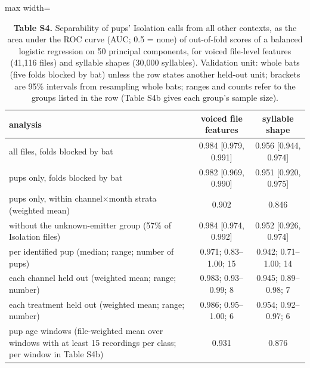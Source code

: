 \begin{table}[htbp]\centering\scriptsize
\caption{\textbf{Table S4.} Separability of pups' Isolation calls from all other contexts, as the area under the ROC curve (AUC; 0.5 = none) of out-of-fold scores of a balanced logistic regression on 50 principal components, for voiced file-level features (41,116 files) and syllable shapes (30,000 syllables). Validation unit: whole bats (five folds blocked by bat) unless the row states another held-out unit; brackets are 95\% intervals from resampling whole bats; ranges and counts refer to the groups listed in the row (Table S4b gives each group's sample size).}\label{tab:S4}
\begin{adjustbox}{max width=\linewidth}
\begin{tabular}{lcc}
\toprule
analysis & voiced file features & syllable shape \\
\midrule
all files, folds blocked by bat & 0.984 [0.979, 0.991] & 0.956 [0.944, 0.974] \\
pups only, folds blocked by bat & 0.982 [0.969, 0.990] & 0.951 [0.920, 0.975] \\
pups only, within channel$\times$month strata (weighted mean) & 0.902 & 0.846 \\
without the unknown-emitter group (57\% of Isolation files) & 0.984 [0.974, 0.992] & 0.952 [0.926, 0.974] \\
per identified pup (median; range; number of pups) & 0.971; 0.83--1.00; 15 & 0.942; 0.71--1.00; 14 \\
each channel held out (weighted mean; range; number) & 0.983; 0.93--0.99; 8 & 0.945; 0.89--0.98; 7 \\
each treatment held out (weighted mean; range; number) & 0.986; 0.95--1.00; 6 & 0.954; 0.92--0.97; 6 \\
pup age windows (file-weighted mean over windows with at least 15 recordings per class; per window in Table S4b) & 0.931 & 0.876 \\
\bottomrule
\end{tabular}
\end{adjustbox}
\end{table}
